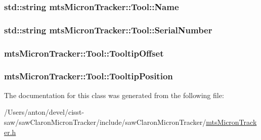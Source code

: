 \subsubsection[{Name}]{\setlength{\rightskip}{0pt plus 5cm}std\+::string mts\+Micron\+Tracker\+::\+Tool\+::\+Name}\label{classmts_micron_tracker_1_1_tool_a99366ed64e7a289aafe66e76b467614e}
\hypertarget{classmts_micron_tracker_1_1_tool_a474f21c01419e5afa938b1a6e0c27257}{}
\subsubsection[{Serial\+Number}]{\setlength{\rightskip}{0pt plus 5cm}std\+::string mts\+Micron\+Tracker\+::\+Tool\+::\+Serial\+Number}\label{classmts_micron_tracker_1_1_tool_a474f21c01419e5afa938b1a6e0c27257}
\hypertarget{classmts_micron_tracker_1_1_tool_a661b9476c03d797ce5800bc887a35ceb}{}
\subsubsection[{Tooltip\+Offset}]{ mts\+Micron\+Tracker\+::\+Tool\+::\+Tooltip\+Offset}\label{classmts_micron_tracker_1_1_tool_a661b9476c03d797ce5800bc887a35ceb}
\hypertarget{classmts_micron_tracker_1_1_tool_a053af3e76832fc8cf0df4dc188e0ce8f}{}
\subsubsection[{Tooltip\+Position}]{ mts\+Micron\+Tracker\+::\+Tool\+::\+Tooltip\+Position}\label{classmts_micron_tracker_1_1_tool_a053af3e76832fc8cf0df4dc188e0ce8f}


The documentation for this class was generated from the following file\+:\begin{DoxyCompactItemize}
\item 
/\+Users/anton/devel/cisst-\/saw/saw\+Claron\+Micron\+Tracker/include/saw\+Claron\+Micron\+Tracker/\hyperlink{mts_micron_tracker_8h}{mts\+Micron\+Tracker.\+h}\end{DoxyCompactItemize}

